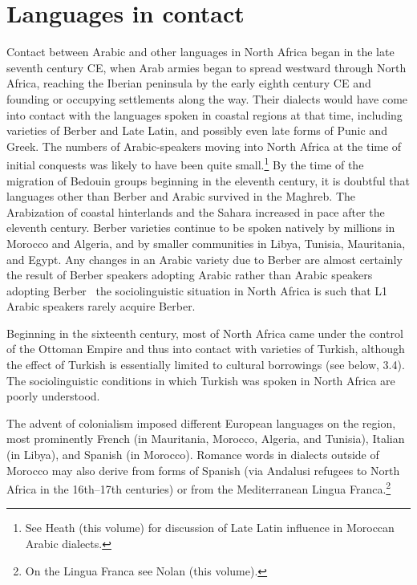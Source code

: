 \documentclass[output=paper]{langsci/langscibook}
\begin{document}
\section{ Languages in contact}

Contact between Arabic and other languages in North Africa began in the late seventh century CE, when Arab armies began to spread westward through North Africa, reaching the Iberian peninsula by the early eighth century CE and founding or occupying settlements along the way. Their dialects would have come into contact with the languages spoken in coastal regions at that time, including varieties of Berber and Late Latin, and possibly even late forms of Punic and Greek. The numbers of Arabic-speakers moving into North Africa at the time of initial conquests was likely to have been quite small.\footnote{See Heath (this volume) for discussion of Late Latin influence in Moroccan Arabic dialects.} By the time of the migration of Bedouin groups beginning in the eleventh century, it is doubtful that languages other than Berber and Arabic survived in the Maghreb. The Arabization of coastal hinterlands and the Sahara increased in pace after the eleventh century. Berber varieties continue to be spoken natively by millions in Morocco and Algeria, and by smaller communities in Libya, Tunisia, Mauritania, and Egypt. Any changes in an Arabic variety due to Berber are almost certainly the result of Berber speakers adopting Arabic rather than Arabic speakers adopting Berber \textendash \, the sociolinguistic situation in North Africa is such that L1 Arabic speakers rarely acquire Berber.

  Beginning in the sixteenth century, most of North Africa came under the control of the Ottoman Empire and thus into contact with varieties of Turkish, although the effect of Turkish is essentially limited to cultural borrowings (see below, 3.4). The sociolinguistic conditions in which Turkish was spoken in North Africa are poorly understood.

  The advent of colonialism imposed different European languages on the region, most prominently French (in Mauritania, Morocco, Algeria, and Tunisia), Italian (in Libya), and Spanish (in Morocco). Romance words in dialects outside of Morocco may also derive from forms of Spanish (via Andalusi refugees to North Africa in the 16th--17th centuries) or from the Mediterranean Lingua Franca.\footnote{On the Lingua Franca see Nolan (this volume).}
\end{document}
